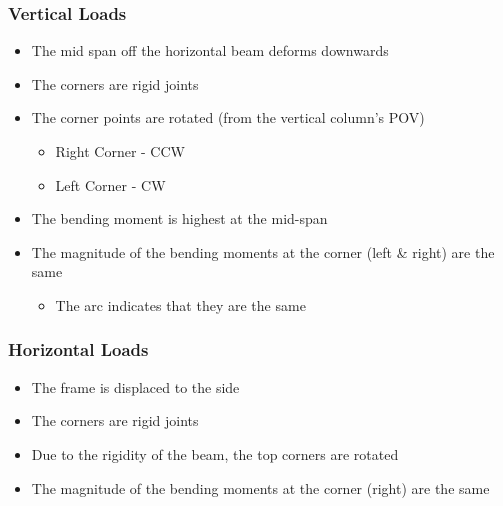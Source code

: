 \documentclass[class=report, crop=false, 12pt,a4paper]{standalone}
\begin{document}
\subsubsection{Vertical Loads}
\begin{itemize}
  \item The mid span off the horizontal beam deforms downwards
  \item The corners are rigid joints
  \item The corner points are rotated (from the vertical column's POV)
  \begin{itemize}
    \item Right Corner - CCW
    \item Left Corner - CW
  \end{itemize}
  \item The bending moment is highest at the mid-span
  \item The magnitude of the bending moments at the corner (left \& right) are the same
  \begin{itemize}
    \item The arc indicates that they are the same
  \end{itemize}
\end{itemize}
\subsubsection{Horizontal Loads}
\begin{itemize}
  \item The frame is displaced to the side
  \item The corners are rigid joints
  \item Due to the rigidity of the beam, the top corners are rotated
  \item The magnitude of the bending moments at the corner (right) are the same
\end{itemize}
\end{document}
